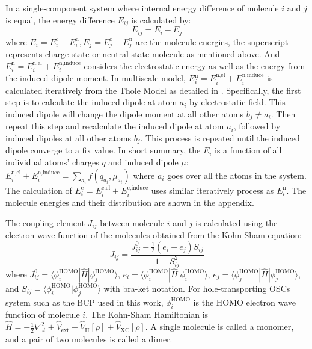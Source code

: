 \documentclass[letterpaper,12pt]{article}
\begin{document}
In a single-component system where internal energy difference of molecule $i$ and $j$ is equal, the energy difference $E_{ij}$ is calculated by:
\begin{equation}
    E_{ij} = E_i - E_j
    \label{eq:siteE}
\end{equation}
where $E_i = E_i^\text{c} - E_i^\text{n},E_j = E_j^\text{c} - E_j^\text{n}$ are the molecule energies, the superscript represents charge state or neutral state molecule as mentioned above. And $E_i^\text{n} = E_i^\text{n,el} + E_i^\text{n,induce}$ considers the electrostatic energy as well as the energy from the induced dipole moment.
In multiscale model, $E_i^\text{n} = E_i^\text{n,el} + E_i^\text{n,induce}$ is calculated iteratively from the Thole Model as detailed in \cite{thole_molecular_1981}.
Specifically, the first step is to calculate the induced dipole at atom $a_i$ by electrostatic field. This induced dipole will change the dipole moment at all other atoms $b_j \neq a_i$. Then repeat this step and recalculate the induced dipole at atom $a_i$, followed by induced dipoles at all other atoms $b_j$. This process is repeated until the induced dipole converge to a fix value. 
In short summary, the $E_i$ is a function of all individual atoms' charges $q$ and induced dipole $\mu$: $E_i^\text{n,el} + E_i^\text{n,induce} = \sum\limits_{a_i} f(q_{a_i}, \mu_{a_i})$ where $a_i$ goes over all the atoms in the system. 
The calculation of $E_i^\text{c} = E_i^\text{c,el} + E_i^\text{c,induce}$ uses similar iteratively process as $E_i^\text{n}$.
The molecule energies and their distribution are shown in the appendix.

The coupling element $J_{ij}$ between molecule $i$ and $j$ is calculated \cite{baumeier_density_2010} using the electron wave function of the molecules obtained from the Kohn-Sham equation: 
\begin{equation}
    J_{ij} = \frac{ J^0_{ij}- \frac{1}{2}(e_i+e_j) S_{ij} }{ 1- S_{ij}^2 }
    \label{equ:JAB}
\end{equation}
where $J^0_{ij} = \langle \phi^\text{HOMO}_i | \hat{H} | \phi^\text{HOMO}_j \rangle $, $e_i = \langle \phi^\text{HOMO}_i | \hat{H} | \phi^\text{HOMO}_i \rangle $, $e_j = \langle \phi^\text{HOMO}_j | \hat{H} | \phi^\text{HOMO}_j \rangle $, and $S_{ij}=\langle \phi^\text{HOMO}_i | \phi^\text{HOMO}_j \rangle $ with bra-ket notation.
For hole-transporting OSCs system such as the BCP used in this work, $\phi^\text{HOMO}_i$ is the HOMO electron wave function of molecule $i$. 
The Kohn-Sham Hamiltonian is $\hat{H} = -\frac{1}{2}\nabla^2_{\vec{r}} + \hat{V}_\text{ext} + \hat{V}_\text{H}[\rho] + \hat{V}_\text{XC}[\rho]$. 
A single molecule is called a monomer, and a pair of two molecules is called a dimer.
\end{document}
